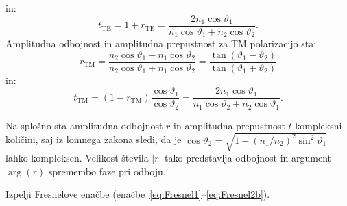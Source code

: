 in:
\begin{equation}
t_{\mathrm{TE}}=1+r_{\mathrm{TE}}=\frac{2n_{1}\cos\vartheta_{1}}{n_{1}\cos\vartheta_{1}+
n_{2}\cos\vartheta_{2}}.
\end{equation}
Amplitudna odbojnost in amplitudna prepustnost za TM polarizacijo sta:
\begin{equation}
r_{\mathrm{TM}}=\frac{n_{2}\cos\vartheta_{1}-n_{1}\cos\vartheta_{2}}{n_{2}\cos\vartheta_{1}+n_{1}\cos\vartheta_{2}} = \frac{\tan(\vartheta_1-\vartheta_2)}{\tan(\vartheta_1+\vartheta_2)}
\label{eq:Fresnel2}
\end{equation}
in:
\begin{equation}
t_{\mathrm{TM}}=(1-r_{\mathrm{TM}})\frac{\cos\vartheta_{1}}{\cos\vartheta_{2}}=
\frac{2n_{1}\cos\vartheta_{1}}
{n_{1}\cos\vartheta_{2}+n_{2}\cos\vartheta_{1}}.
\label{eq:Fresnel2b}
\end{equation}

Na splošno sta amplitudna odbojnost $r$ in amplitudna prepustnost $t$ kompleksni
količini, saj iz lomnega zakona sledi, da je $\cos\vartheta_{2}=
\sqrt{1-\left(n_{1}/n_{2}\right)^{2}\sin^{2}\vartheta_{1}}$
lahko kompleksen. Velikost števila $\left|r\right|$ tako predstavlja
odbojnost in argument $\arg(r)$ spremembo faze
pri odboju.

\begin{naloga}
Izpelji Fresnelove enačbe (enačbe~\ref{eq:Fresnel1}--\ref{eq:Fresnel2b}).
\end{naloga}

